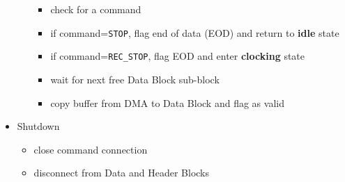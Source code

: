 \begin{itemize}
\begin{itemize}
	\vspace{-2mm}
		\begin{itemize}
		\item check for a command
		\item if command={\tt STOP}, flag end of data (EOD) and return to {\bf idle} state
		\item if command={\tt REC\_STOP}, flag EOD and enter {\bf clocking} state
		\item wait for next free Data Block sub-block
		\item copy buffer from DMA to Data Block and flag as valid
		\end{itemize}
	\end{itemize}
\item Shutdown
\vspace{-3mm}
	\begin{itemize}
	\item close command connection
	\item disconnect from Data and Header Blocks
	\end{itemize}
\end{itemize}




